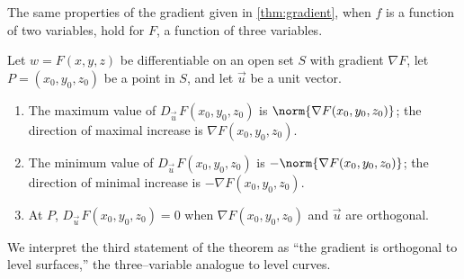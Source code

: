 The same properties of the gradient given in \autoref{thm:gradient}, when $f$ is a function of two variables, hold for $F$, a function of three variables.

{Let $w=F(x,y,z)$ be differentiable on an open set $S$ with gradient $\nabla F$, let $P=(x_0,y_0,z_0)$ be a point in $S$, and let $\vec u$ be a unit vector.
\begin{enumerate}
	\item The maximum value of $D_{\vec u\,}F(x_0,y_0,z_0)$ is $\norm{\nabla F(x_0,y_0,z_0)}$; %
	 the direction of maximal increase is $\nabla F(x_0,y_0,z_0)$.
	\item The minimum value of $D_{\vec u\,}F(x_0,y_0,z_0)$ is $-\norm{\nabla F(x_0,y_0,z_0)}$; %
	 the direction of minimal increase is $-\nabla F(x_0,y_0,z_0)$.
	\item At $P$, $D_{\vec u\,}F(x_0,y_0,z_0) = 0$ when $\nabla F(x_0,y_0,z_0)$ and $\vec u$ are orthogonal.
\end{enumerate}
}

We interpret the third statement of the theorem as ``the gradient is orthogonal to level surfaces,'' the three--variable analogue to level curves.

